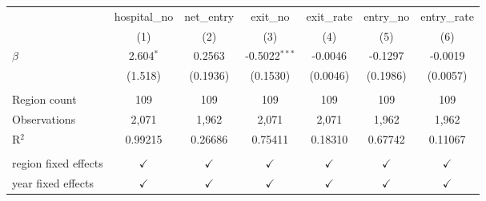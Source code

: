 \begingroup
\centering
\begin{tabular}{lcccccc}
   \toprule
                        & hospital\_no  & net\_entry    & exit\_no        & exit\_rate    & entry\_no     & entry\_rate\\   
                        & (1)           & (2)           & (3)             & (4)           & (5)           & (6)\\  
   \midrule 
   $\beta$              & 2.604$^{*}$   & 0.2563        & -0.5022$^{***}$ & -0.0046       & -0.1297       & -0.0019\\   
                        & (1.518)       & (0.1936)      & (0.1530)        & (0.0046)      & (0.1986)      & (0.0057)\\   
    \\
   Region count         & 109           & 109           & 109           & 109           & 109           & 109\\
   Observations         & 2,071         & 1,962         & 2,071           & 2,071         & 1,962         & 1,962\\  
   R$^2$                & 0.99215       & 0.26686       & 0.75411         & 0.18310       & 0.67742       & 0.11067\\  
    \\
   region fixed effects & $\checkmark$  & $\checkmark$  & $\checkmark$    & $\checkmark$  & $\checkmark$  & $\checkmark$\\   
   year fixed effects   & $\checkmark$  & $\checkmark$  & $\checkmark$    & $\checkmark$  & $\checkmark$  & $\checkmark$\\   
   \bottomrule
\end{tabular}
\par\endgroup
